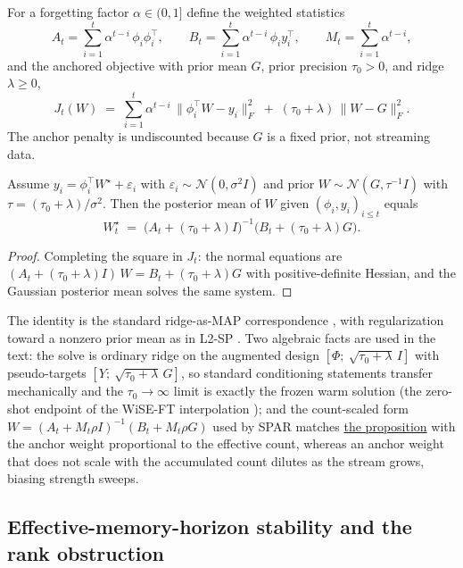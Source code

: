 For a forgetting factor $\alpha \in (0,1]$ define the weighted statistics
\[
  A_t = \sum_{i=1}^t \alpha^{t-i}\,\phi_i\phi_i^\top, \qquad
  B_t = \sum_{i=1}^t \alpha^{t-i}\,\phi_i y_i^\top, \qquad
  M_t = \sum_{i=1}^t \alpha^{t-i},
\]
and the anchored objective with prior mean $G$, prior precision $\tau_0 > 0$, and ridge $\lambda \ge 0$,
\[
  J_t(W) \;=\; \sum_{i=1}^t \alpha^{t-i}\,\|\phi_i^\top W - y_i\|_F^2
  \;+\; (\tau_0 + \lambda)\,\|W - G\|_F^2 .
\]
The anchor penalty is undiscounted because $G$ is a fixed prior, not streaming data.

\begin{proposition}
\label{prop:app-map}
Assume $y_i = \phi_i^\top W^\star + \varepsilon_i$ with $\varepsilon_i \sim \mathcal N(0, \sigma^2 I)$ and prior $W \sim \mathcal N(G, \tau^{-1} I)$ with $\tau = (\tau_0 + \lambda)/\sigma^2$.
Then the posterior mean of $W$ given $(\phi_i, y_i)_{i \le t}$ equals
\[
  W_t^\star \;=\; \bigl(A_t + (\tau_0 + \lambda) I\bigr)^{-1}\bigl(B_t + (\tau_0 + \lambda) G\bigr).
\]
\end{proposition}
\begin{proof}
Completing the square in $J_t$: the normal equations are $(A_t + (\tau_0 + \lambda)I)\,W = B_t + (\tau_0 + \lambda)G$ with positive-definite Hessian, and the Gaussian posterior mean solves the same system.
\end{proof}

The identity is the standard ridge-as-MAP correspondence \citep{hoerl1970,rasmussen2006}, with regularization toward a nonzero prior mean as in L2-SP \citep{li2018l2sp}.
Two algebraic facts are used in the text: the solve is ordinary ridge on the augmented design $[\Phi;\ \sqrt{\tau_0 + \lambda}\,I]$ with pseudo-targets $[Y;\ \sqrt{\tau_0 + \lambda}\,G]$, so standard conditioning statements transfer mechanically and the $\tau_0 \to \infty$ limit is exactly the frozen warm solution (the zero-shot endpoint of the WiSE-FT interpolation \citep{wortsman2022wiseft}); and the count-scaled form $W = (A_t + M_t\rho I)^{-1}(B_t + M_t \rho G)$ used by SPAR matches \hyperref[prop:app-map]{the proposition} with the anchor weight proportional to the effective count, whereas an anchor weight that does not scale with the accumulated count dilutes as the stream grows, biasing strength sweeps.

\subsection{Effective-memory-horizon stability and the rank obstruction}
\label{app:support-emh}

